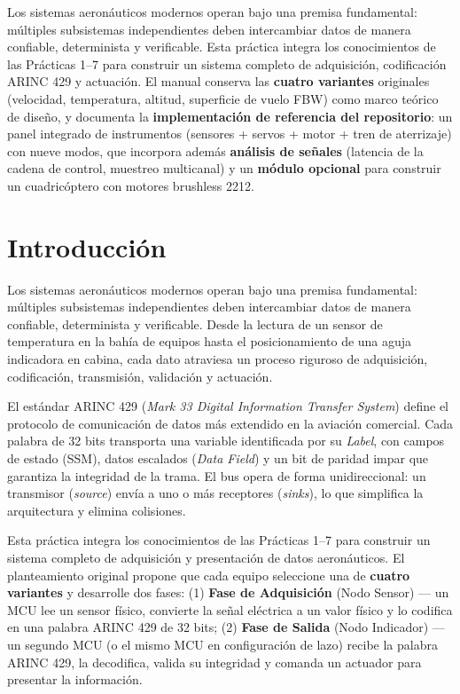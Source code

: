 \documentclass[11pt]{article}
\begin{document}
\portada

\begin{resumen}
Los sistemas aeronáuticos modernos operan bajo una premisa fundamental: múltiples
subsistemas independientes deben intercambiar datos de manera confiable, determinista y
verificable. Esta práctica integra los conocimientos de las Prácticas 1--7 para construir
un sistema completo de adquisición, codificación ARINC 429 y actuación. El manual
conserva las \textbf{cuatro variantes} originales (velocidad, temperatura, altitud,
superficie de vuelo FBW) como marco teórico de diseño, y documenta la
\textbf{implementación de referencia del repositorio}: un panel integrado de
instrumentos (sensores + servos + motor + tren de aterrizaje) con nueve modos, que
incorpora además \textbf{análisis de señales} (latencia de la cadena de control,
muestreo multicanal) y un \textbf{módulo opcional} para construir un cuadricóptero con
motores brushless 2212.
\end{resumen}

\tableofcontents
\newpage

\section{Introducción}

Los sistemas aeronáuticos modernos operan bajo una premisa fundamental: múltiples
subsistemas independientes deben intercambiar datos de manera confiable, determinista y
verificable. Desde la lectura de un sensor de temperatura en la bahía de equipos hasta el
posicionamiento de una aguja indicadora en cabina, cada dato atraviesa un proceso riguroso
de adquisición, codificación, transmisión, validación y actuación.

El estándar ARINC 429 (\emph{Mark 33 Digital Information Transfer System}) define el
protocolo de comunicación de datos más extendido en la aviación comercial. Cada palabra
de 32 bits transporta una variable identificada por su \emph{Label}, con campos de estado
(SSM), datos escalados (\emph{Data Field}) y un bit de paridad impar que garantiza la
integridad de la trama. El bus opera de forma unidireccional: un transmisor (\emph{source})
envía a uno o más receptores (\emph{sinks}), lo que simplifica la arquitectura y elimina
colisiones.

Esta práctica integra los conocimientos de las Prácticas 1--7 para construir un sistema
completo de adquisición y presentación de datos aeronáuticos. El planteamiento original
propone que cada equipo seleccione una de \textbf{cuatro variantes} y desarrolle dos
fases: (1) \textbf{Fase de Adquisición} (Nodo Sensor) — un MCU lee un sensor físico,
convierte la señal eléctrica a un valor físico y lo codifica en una palabra ARINC 429 de
32 bits; (2) \textbf{Fase de Salida} (Nodo Indicador) — un segundo MCU (o el mismo MCU en
configuración de lazo) recibe la palabra ARINC 429, la decodifica, valida su integridad y
comanda un actuador para presentar la información.
\end{document}
